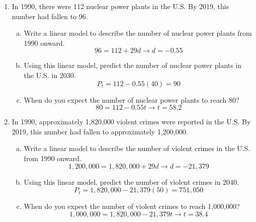 \begin{enumerate}
\item In 1990, there were 112 nuclear power plants in the U.S.  By 2019, this number had fallen to 96.
\begin{enumerate}[(a)]
\item Write a linear model to describe the number of nuclear power plants from 1990 onward. 
\[96 = 112 + 29d \longrightarrow d = -0.55\]
\item Using this linear model, predict the number of nuclear power plants in the U.S. in 2030. 
\[P_t = 112 - 0.55(40) = 90\]
\item When do you expect the number of nuclear power plants to reach 80? 
\[80 = 112 - 0.55t \longrightarrow t = 58.2\] 
\end{enumerate}

\item In 1990, approximately 1,820,000 violent crimes were reported in the U.S.  By 2019, this number had fallen to approximately 1,200,000.
\begin{enumerate}[(a)]
\item Write a linear model to describe the number of violent crimes in the U.S. from 1990 onward. 
\[1,200,000 = 1,820,000 + 29d \longrightarrow d = -21,379\]
\item Using this linear model, predict the number of violent crimes in 2040. 
\[P_t = 1,820,000 - 21,379(50) = 751,050\]
\item When do you expect the number of violent crimes to reach 1,000,000? 
\[1,000,000 = 1,820,000 - 21,379t \longrightarrow t = 38.4\]
\end{enumerate}


\end{enumerate}

